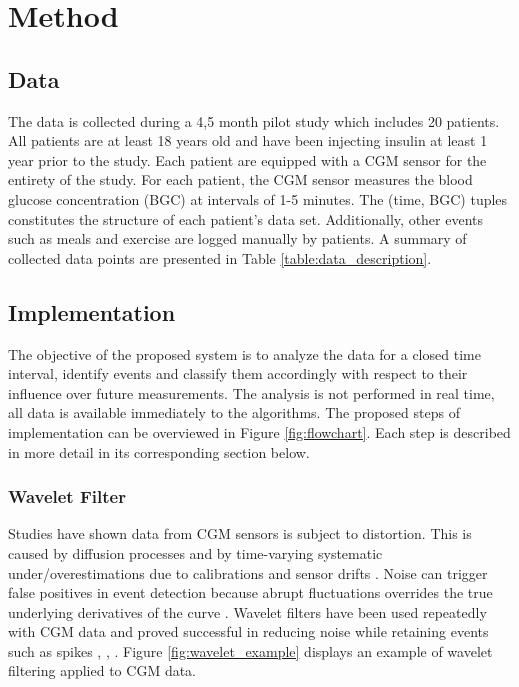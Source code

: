 \chapter{Method}

\section{Data}

The data is collected during a 4,5 month pilot study which includes 20 patients.
All patients are at least 18 years old and have been injecting insulin at least 1 year prior to the study.
Each patient are equipped with a CGM sensor for the entirety of the study.
For each patient, the CGM sensor measures the blood glucose concentration (BGC) at intervals of 1-5 minutes.
The (time, BGC) tuples constitutes the structure of each patient's data set.
Additionally, other events such as meals and exercise are logged manually by patients.
A summary of collected data points are presented in Table \ref{table:data_description}.



\section{Implementation}

The objective of the proposed system is to analyze the data for a closed time interval, identify events and classify them accordingly with respect to their influence over future measurements.
The analysis is not performed in real time, all data is available immediately to the algorithms.
The proposed steps of implementation can be overviewed in Figure \ref{fig:flowchart}.
Each step is described in more detail in its corresponding section below.



\subsection{Wavelet Filter}

Studies have shown data from CGM sensors is subject to distortion.
This is caused by diffusion processes and by time-varying systematic under/overestimations due to calibrations and sensor drifts \parencite{facchinetti2014modeling}.
Noise can trigger false positives in event detection because abrupt fluctuations overrides the true underlying derivatives of the curve \parencite{Facchinetti2016}.
Wavelet filters have been used repeatedly with CGM data and proved successful in reducing noise while retaining events such as spikes \parencite{Mag2016}, \parencite{Facchinetti2016}, \parencite{samadi2017}.
Figure \ref{fig:wavelet_example} displays an example of wavelet filtering applied to CGM data.

